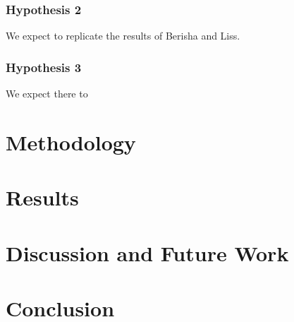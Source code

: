 \documentclass{article}
\begin{document}
\subsubsection{Hypothesis 2}
We expect to replicate the results of Berisha and Liss.
\subsubsection{Hypothesis 3}
We expect there to 
\section{Methodology}
\section{Results}
\section{Discussion and Future Work}
\section{Conclusion}


\end{document}

